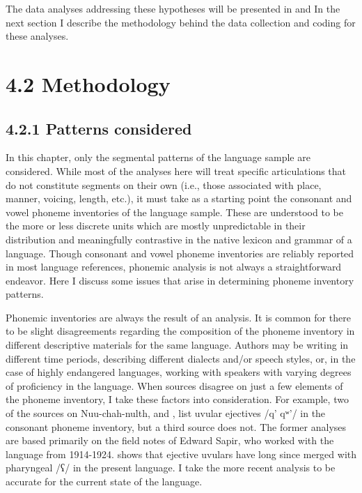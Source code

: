   The data analyses addressing these hypotheses will be presented in  and  In the next section I describe the methodology behind the data collection and coding for these analyses.

\section{4.2 Methodology}
\subsection{4.2.1 Patterns considered}

  In this chapter, only the segmental patterns of the language sample are considered. While most of the analyses here will treat specific articulations that do not constitute segments on their own (i.e., those associated with place, manner, voicing, length, etc.), it must take as a starting point the consonant and vowel phoneme inventories of the language sample. These are understood to be the more or less discrete units which are mostly unpredictable in their distribution and meaningfully contrastive in the native lexicon and grammar of a language. Though consonant and vowel phoneme inventories are reliably reported in most language references, phonemic analysis is not always a straightforward endeavor. Here I discuss some issues that arise in determining phoneme inventory patterns.

  Phonemic inventories are always the result of an analysis. It is common for there to be slight disagreements regarding the composition of the phoneme inventory in different descriptive materials for the same language. Authors may be writing in different time periods, describing different dialects and/or speech styles, or, in the case of highly endangered languages, working with speakers with varying degrees of proficiency in the language. When sources disagree on just a few elements of the phoneme inventory, I take these factors into consideration. For example, two of the sources on Nuu-chah-nulth, \citet{Stonham1999} and \citet{Davidson2002}, list uvular ejectives /q’ qʷ’/ in the consonant phoneme inventory, but a third source \citep{Kim2003} does not. The former analyses are based primarily on the field notes of Edward Sapir, who worked with the language from 1914-1924. \citet{Kim2003} shows that ejective uvulars have long since merged with pharyngeal /ʕ/ in the present language. I take the more recent analysis to be accurate for the current state of the language. 

